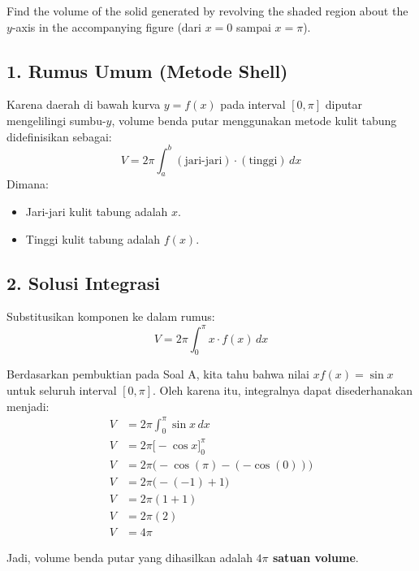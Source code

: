 \documentclass[12pt,a4paper]{article}
\begin{document}
Find the volume of the solid generated by revolving the shaded region about the $y$-axis in the accompanying figure (dari $x = 0$ sampai $x = \pi$).

\subsection*{1. Rumus Umum (Metode Shell)}
Karena daerah di bawah kurva $y = f(x)$ pada interval $[0, \pi]$ diputar mengelilingi sumbu-$y$, volume benda putar menggunakan metode kulit tabung didefinisikan sebagai:
\begin{equation*}
  V = 2\pi \int_{a}^{b} (\text{jari-jari}) \cdot (\text{tinggi}) \, dx
\end{equation*}
Dimana:
\begin{itemize}
  \item Jari-jari kulit tabung adalah $x$.
  \item Tinggi kulit tabung adalah $f(x)$.
\end{itemize}

\subsection*{2. Solusi Integrasi}
Substitusikan komponen ke dalam rumus:
\begin{equation*}
  V = 2\pi \int_{0}^{\pi} x \cdot f(x) \, dx
\end{equation*}

Berdasarkan pembuktian pada Soal A, kita tahu bahwa nilai $x f(x) = \sin x$ untuk seluruh interval $[0, \pi]$. Oleh karena itu, integralnya dapat disederhanakan menjadi:
\begin{align*}
  V &= 2\pi \int_{0}^{\pi} \sin x \, dx \\
  V &= 2\pi \Big[ -\cos x \Big]_{0}^{\pi} \\
  V &= 2\pi \Big( -\cos(\pi) - (-\cos(0)) \Big) \\
  V &= 2\pi \Big( -(-1) + 1 \Big) \\
  V &= 2\pi (1 + 1) \\
  V &= 2\pi (2) \\
  V &= 4\pi
\end{align*}

Jadi, volume benda putar yang dihasilkan adalah \textbf{$4\pi$ satuan volume}.
\end{document}
